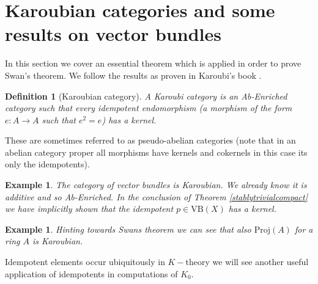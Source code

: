 \documentclass[12pt]{report}
\numberwithin{equation}{section}
\newtheorem{definition}[dummy]{Definition}
\newtheorem{example}[dummy]{Example}
\begin{document}
	\section{Karoubian categories and some results on vector bundles}
	In this section we cover an essential theorem which is applied in order to prove Swan's theorem. We follow the results as proven in Karoubi's book \cite{karoubi2008k}.
	
	\begin{definition}[Karoubian category]
		A Karoubi category is an Ab-Enriched category such that every idempotent endomorphism (a morphism of the form $e:A \to A$ such that $e^2=e$) has a kernel.
	\end{definition}
	These are sometimes referred to as pseudo-abelian categories (note that in an abelian category proper all morphisms have kernels and cokernels in this case its only the idempotents).
	\begin{example}
		The category of vector bundles is Karoubian. We already know it is additive and so Ab-Enriched. In the conclusion of Theorem \ref{stablytrivialcompact} we have implicitly shown that the idempotent $p \in \mathrm{VB}(X)$ has a kernel.
	\end{example}
	\begin{example}
		Hinting towards Swans theorem we can see that also $\mathrm{Proj}(A)$ for a ring $A$ is Karoubian.
	\end{example}
	Idempotent elements occur ubiquitously in $K-$theory we will see another useful application of idempotents in computations of $K_0$.
	
\end{document}
